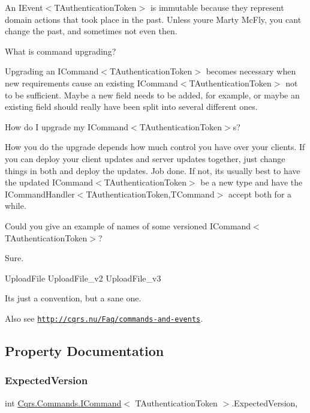 An I\+Event$<$\+T\+Authentication\+Token$>$ is immutable because they represent domain actions that took place in the past. Unless you\textquotesingle{}re Marty Mc\+Fly, you can\textquotesingle{}t change the past, and sometimes not even then.

What is command upgrading?

Upgrading an I\+Command$<$\+T\+Authentication\+Token$>$ becomes necessary when new requirements cause an existing I\+Command$<$\+T\+Authentication\+Token$>$ not to be sufficient. Maybe a new field needs to be added, for example, or maybe an existing field should really have been split into several different ones.

How do I upgrade my I\+Command$<$\+T\+Authentication\+Token$>$s?

How you do the upgrade depends how much control you have over your clients. If you can deploy your client updates and server updates together, just change things in both and deploy the updates. Job done. If not, it\textquotesingle{}s usually best to have the updated I\+Command$<$\+T\+Authentication\+Token$>$ be a new type and have the I\+Command\+Handler$<$\+T\+Authentication\+Token,\+T\+Command$>$ accept both for a while.

Could you give an example of names of some versioned I\+Command$<$\+T\+Authentication\+Token$>$?

Sure.

Upload\+File Upload\+File\+\_\+v2 Upload\+File\+\_\+v3

It\textquotesingle{}s just a convention, but a sane one. 

 Also see \href{http://cqrs.nu/Faq/commands-and-events}{\tt http\+://cqrs.\+nu/\+Faq/commands-\/and-\/events}. 

\subsection{Property Documentation}
\mbox{\label{interfaceCqrs_1_1Commands_1_1ICommand_a8b207da81f36bd4426e83e2ec948eb49}} 
\subsubsection{\texorpdfstring{Expected\+Version}{ExpectedVersion}}
{\footnotesize\ttfamily int \hyperlink{interfaceCqrs_1_1Commands_1_1ICommand}{Cqrs.\+Commands.\+I\+Command}$<$ T\+Authentication\+Token $>$.Expected\+Version\hspace{0.3cm}{\ttfamily [get]}, {\ttfamily [set]}}

